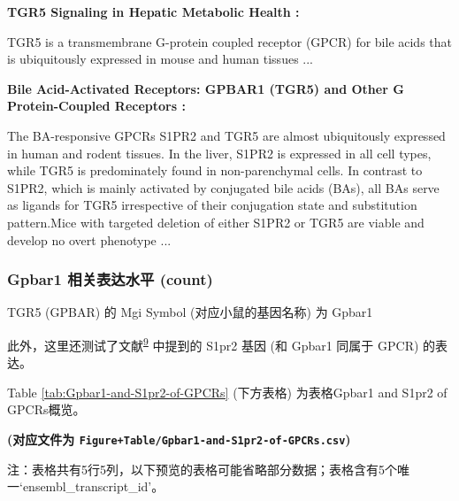\documentclass[
]{article}
\begin{document}
\begin{center}\begin{tcolorbox}[colback=gray!10, colframe=gray!50, width=0.9\linewidth, arc=1mm, boxrule=0.5pt]
\textbf{
TGR5 Signaling in Hepatic Metabolic Health
:}

\vspace{0.5em}

    TGR5 is a transmembrane G-protein coupled receptor
(GPCR) for bile acids that is ubiquitously expressed in
mouse and human tissues ...

\vspace{2em}


\textbf{
Bile Acid-Activated Receptors: GPBAR1 (TGR5) and Other G Protein-Coupled Receptors
:}

\vspace{0.5em}

    The BA-responsive GPCRs S1PR2 and TGR5 are almost
ubiquitously expressed in human and rodent tissues. In the
liver, S1PR2 is expressed in all cell types, while TGR5 is
predominately found in non-parenchymal cells. In contrast
to S1PR2, which is mainly activated by conjugated bile
acids (BAs), all BAs serve as ligands for TGR5 irrespective
of their conjugation state and substitution pattern.Mice
with targeted deletion of either S1PR2 or TGR5 are viable
and develop no overt phenotype ...

\vspace{2em}
\end{tcolorbox}
\end{center}

\hypertarget{gpbar1-ux76f8ux5173ux8868ux8fbeux6c34ux5e73-count}{%
\subsubsection{Gpbar1 相关表达水平 (count)}\label{gpbar1-ux76f8ux5173ux8868ux8fbeux6c34ux5e73-count}}

TGR5 (GPBAR) 的 Mgi Symbol (对应小鼠的基因名称) 为 Gpbar1

此外，这里还测试了文献\textsuperscript{\protect\hyperlink{ref-BileAcidActivKeitel2019}{9}} 中提到的 S1pr2 基因 (和 Gpbar1 同属于 GPCR) 的表达。

Table \ref{tab:Gpbar1-and-S1pr2-of-GPCRs} (下方表格) 为表格Gpbar1 and S1pr2 of GPCRs概览。

\textbf{(对应文件为 \texttt{Figure+Table/Gpbar1-and-S1pr2-of-GPCRs.csv})}

\begin{center}\begin{tcolorbox}[colback=gray!10, colframe=gray!50, width=0.9\linewidth, arc=1mm, boxrule=0.5pt]注：表格共有5行5列，以下预览的表格可能省略部分数据；表格含有5个唯一`ensembl\_transcript\_id'。
\end{tcolorbox}
\end{center}
\end{document}
